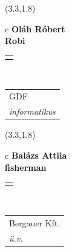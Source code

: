 \documentclass[11pt]{article}
\begin{document}
\makebox(3.3,1.8){
  \renewcommand\arraystretch{1.3}
  \begin{tabular}[c]{c}
    \hspace{8.5mm}
    \LARGE\bf{ Oláh Róbert }\\
    \hspace{8.5mm}
    \Large{ Robi }\\
    \renewcommand\arraystretch{3}
    \begin{tabular}[c]{c}
      \centering
      \fontfamily{phv}\selectfont{
        \textbf{
          \textsc{
            \scriptsize{
            \color{Dark}{ Ismerkedő }\color{Bright}{ Webmester }\color{Bright}{ Sminkmester }\color{Bright}{ Programozó }
            }
          }
        }
      }
    \end{tabular}
    \\
    \renewcommand\arraystretch{1}
    \begin{tabular}{p{3.3in}}
      \hspace{.7cm}GDF\\
      \hspace{.7cm}\emph{ informatikus }\\
    \end{tabular}
  \end{tabular}
}

\makebox(3.3,1.8){
  \renewcommand\arraystretch{1.3}
  \begin{tabular}[c]{c}
    \hspace{8.5mm}
    \LARGE\bf{ Balázs Attila }\\
    \hspace{8.5mm}
    \Large{ fisherman }\\
    \renewcommand\arraystretch{3}
    \begin{tabular}[c]{c}
      \centering
      \fontfamily{phv}\selectfont{
        \textbf{
          \textsc{
            \scriptsize{
            \color{Bright}{ Ismerkedő }\color{Dark}{ Webmester }\color{Bright}{ Sminkmester }\color{Bright}{ Programozó }
            }
          }
        }
      }
    \end{tabular}
    \\
    \renewcommand\arraystretch{1}
    \begin{tabular}{p{3.3in}}
      \hspace{.7cm}Bergauer Kft.\\
      \hspace{.7cm}\emph{ ü.v. }\\
    \end{tabular}
  \end{tabular}
}
\end{document}
